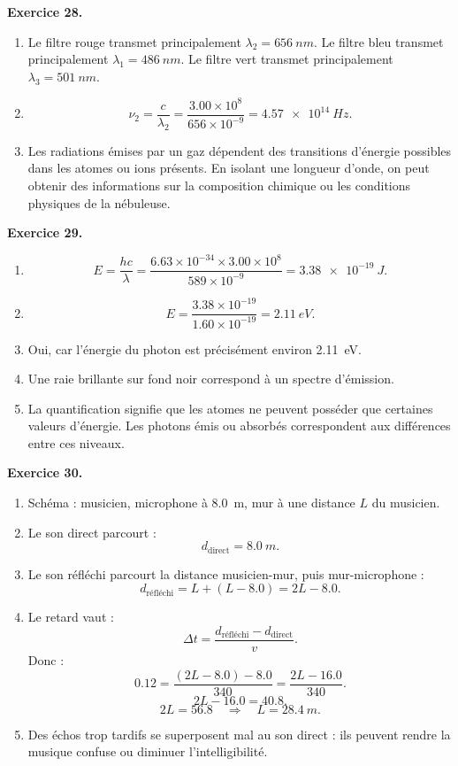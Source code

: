 \documentclass[11pt,a4paper]{article}
\newcommand{\corr}[2]{
  \begin{correctionbox}
  \textbf{Exercice #1.} #2
  \end{correctionbox}
}
\begin{document}
\corr{28}{
\begin{enumerate}
  \item Le filtre rouge transmet principalement $\lambda_2=\SI{656}{nm}$. Le filtre bleu transmet principalement $\lambda_1=\SI{486}{nm}$. Le filtre vert transmet principalement $\lambda_3=\SI{501}{nm}$.
  \item
  \[
  \nu_2=\frac{c}{\lambda_2}
  =\frac{3.00\times 10^8}{656\times 10^{-9}}
  =\SI{4.57e14}{Hz}.
  \]
  \item Les radiations émises par un gaz dépendent des transitions d'énergie possibles dans les atomes ou ions présents. En isolant une longueur d'onde, on peut obtenir des informations sur la composition chimique ou les conditions physiques de la nébuleuse.
\end{enumerate}
}

\corr{29}{
\begin{enumerate}
  \item
  \[
  E=\frac{hc}{\lambda}
  =\frac{6.63\times 10^{-34}\times 3.00\times 10^8}{589\times 10^{-9}}
  =\SI{3.38e-19}{J}.
  \]
  \item
  \[
  E=\frac{3.38\times 10^{-19}}{1.60\times 10^{-19}}
  =\SI{2.11}{eV}.
  \]
  \item Oui, car l'énergie du photon est précisément environ \SI{2.11}{eV}.
  \item Une raie brillante sur fond noir correspond à un spectre d'émission.
  \item La quantification signifie que les atomes ne peuvent posséder que certaines valeurs d'énergie. Les photons émis ou absorbés correspondent aux différences entre ces niveaux.
\end{enumerate}
}

\corr{30}{
\begin{enumerate}
  \item Schéma : musicien, microphone à \SI{8.0}{m}, mur à une distance $L$ du musicien.
  \item Le son direct parcourt :
  \[
  d_{\text{direct}}=\SI{8.0}{m}.
  \]
  \item Le son réfléchi parcourt la distance musicien-mur, puis mur-microphone :
  \[
  d_{\text{réfléchi}}=L+(L-8.0)=2L-8.0.
  \]
  \item Le retard vaut :
  \[
  \Delta t=\frac{d_{\text{réfléchi}}-d_{\text{direct}}}{v}.
  \]
  Donc :
  \[
  0.12=\frac{(2L-8.0)-8.0}{340}
  =\frac{2L-16.0}{340}.
  \]
  \[
  2L-16.0=40.8.
  \]
  \[
  2L=56.8
  \quad \Rightarrow \quad
  L=\SI{28.4}{m}.
  \]
  \item Des échos trop tardifs se superposent mal au son direct : ils peuvent rendre la musique confuse ou diminuer l'intelligibilité.
\end{enumerate}
}
\end{document}
